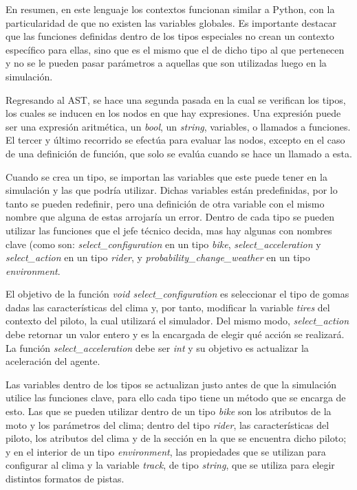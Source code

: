 \documentclass[12pt, letterpaper,spanish]{article}
\theoremstyle{definition}
\theoremstyle{remark}
\begin{document}
	En resumen, en este lenguaje los contextos funcionan similar a Python, con la particularidad de que no existen las variables globales. Es importante destacar que las funciones definidas dentro de los tipos especiales no crean un contexto específico para ellas, sino que es el mismo que el de dicho tipo al que pertenecen y no se le pueden pasar parámetros a aquellas que son utilizadas luego en la simulación.

       Regresando al AST, se hace una segunda pasada en la cual se verifican los tipos, los cuales se inducen en los nodos en que hay expresiones. Una expresión puede ser una expresión aritmética, un \emph{bool}, un \emph{string}, variables, o llamados a funciones. El tercer y último recorrido se efectúa para evaluar las nodos, excepto en el caso de una definición de función, que solo se evalúa cuando se hace un llamado a esta.

        Cuando se crea un tipo, se importan las variables que este puede tener en la simulación y las que podría utilizar. Dichas variables están predefinidas, por lo tanto se pueden redefinir, pero una definición de otra variable con el mismo nombre que alguna de estas arrojaría un error. Dentro de cada tipo se pueden utilizar las funciones que el jefe técnico decida, mas hay algunas con nombres clave (como son: \emph{select\_configuration} en un tipo \emph{bike}, \emph{select\_acceleration} y \emph{select\_action} en un tipo \emph{rider}, y \emph{probability\_change\_weather} en un tipo \emph{environment}. 

	El objetivo de la función \emph{void select\_configuration} es seleccionar el tipo de gomas dadas las características del clima y, por tanto, modificar la variable \emph{tires} del contexto del piloto, la cual utilizará el simulador. Del mismo modo, \emph{select\_action} debe retornar un valor entero y es la encargada de elegir qué acción se realizará. La función \emph{select\_acceleration} debe ser \emph{int} y su objetivo es actualizar la aceleración del agente.

	Las variables dentro de los tipos se actualizan justo antes de que la simulación utilice las funciones clave, para ello cada tipo tiene un método que se encarga de esto. Las que se pueden utilizar dentro de un tipo \emph{bike} son los atributos de la moto y los parámetros del clima; dentro del tipo \emph{rider}, las características del piloto, los atributos del clima y de la sección en la que se encuentra dicho piloto; y en el interior de un tipo \emph{environment}, las propiedades que se utilizan para configurar al clima y la variable \emph{track}, de tipo \emph{string}, que se utiliza para elegir distintos formatos de pistas.      
\end{document}
